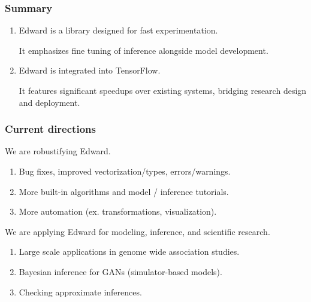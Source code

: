 \documentclass[10pt,
               xcolor={usenames,dvipsnames},
               hyperref={colorlinks,linktoc=all,citecolor=Plum,linkcolor=MidnightBlue,urlcolor=MidnightBlue},noamssymb]{beamer}
\begin{document}
\begin{frame}[c]
\frametitle{Summary}
\begin{enumerate}
\item
Edward is a library designed for fast experimentation.

It emphasizes fine tuning of inference alongside model development.
\item
Edward is integrated into TensorFlow.

It features significant speedups over existing systems, bridging
research design and deployment.
\end{enumerate}
\end{frame}

\begin{frame}
\frametitle{Current directions}

We are robustifying Edward.
\begin{enumerate}
\item Bug fixes, improved vectorization/types, errors/warnings.
\item More built-in algorithms and model / inference tutorials.
\item More automation (ex. transformations, visualization).
\end{enumerate}
\vspace{3ex}

We are applying Edward for modeling, inference, and scientific research.
\begin{enumerate}
\vspace{-1.5ex}
\item
Large scale applications in genome wide association studies.
\item
Bayesian inference for GANs (simulator-based models).
\item
Checking approximate inferences.
\end{enumerate}
\end{frame}
\end{document}
